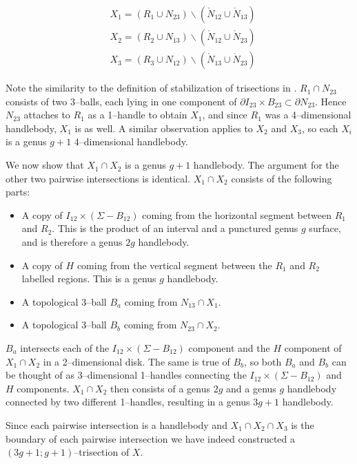 \documentclass[12pt]{amsart}
\newcommand{\del}{\partial }
\theoremstyle{definition}
\theoremstyle{remark}
\begin{document}
\begin{align*}
&X_1 = (R_1 \cup N_{23}) \backslash (\mathring N_{12} \cup \mathring N_{13}) \\
&X_2 = (R_2 \cup N_{13}) \backslash (\mathring N_{12} \cup \mathring N_{23}) \\
&X_3 = (R_3 \cup N_{12}) \backslash (\mathring N_{13} \cup \mathring N_{23})
\end{align*}

Note the similarity to the definition of stabilization of trisections in \cite{GayKirby1}.
$R_1 \cap N_{23}$ consists of two 3--balls, each lying in one component of $\del I_{23} \times B_{23} \subset \del N_{23}$.
Hence $N_{23}$ attaches to $R_1$ as a 1--handle to obtain $X_1$, and since $R_1$ was a 4--dimensional handlebody, $X_1$ is as well.
A similar observation applies to $X_2$ and $X_3$, so each $X_i$ is a genus $g+1$ 4--dimensional handlebody.

We now show that $X_1 \cap X_2$ is a genus $g+1$ handlebody.
The argument for the other two pairwise intersections is identical.
$X_1 \cap X_2$ consists of the following parts:

\begin{itemize}
\item A copy of $I_{12} \times (\Sigma - B_{12})$ coming from the horizontal segment between $R_1$ and $R_2$.
This is the product of an interval and a punctured genus $g$ surface, and is therefore a genus $2g$ handlebody.

\item A copy of $H$ coming from the vertical segment between the $R_1$ and $R_2$ labelled regions.
This is a genus $g$ handlebody.
\item A topological 3--ball $B_a$ coming from $N_{13} \cap X_1$.
\item A topological 3--ball $B_b$ coming from $N_{23} \cap X_2$.
\end{itemize}

$B_a$ intersects each of the $I_{12} \times (\Sigma - B_{12})$ component and the $H$ component of $X_1 \cap X_2$ in a 2--dimensional disk.
The same is true of $B_b$, so both $B_a$ and $B_b$ can be thought of as 3--dimensional 1--handles connecting the $I_{12} \times (\Sigma - B_{12})$ and $H$ components.
$X_1 \cap X_2$ then consists of a genus $2g$ and a genus $g$ handlebody connected by two different 1--handles, resulting in a genus $3g+1$ handlebody.


Since each pairwise intersection is a handlebody and $X_1 \cap X_2 \cap X_3$ is the boundary of each pairwise intersection we have indeed constructed a $(3g+1;g+1)$--trisection of $X$.
\end{document}
